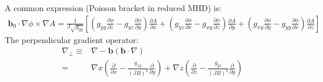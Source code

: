 \documentclass[12pt]{article}
\newcommand{\deriv}[2]{\ensuremath{\frac{\partial #1}{\partial #2}}}
\newcommand{\ve}[1]{\ensuremath{\boldsymbol{#1}}}
\newcommand{\bvec}{\ve{b}}
\begin{document}
%
A common expression (Poisson bracket in reduced MHD) is:
%
\begin{align*}
\bvec_0\cdot\nabla\phi\times\nabla A =
\frac{1}{J\sqrt{g_{yy}}}\left[\left(g_{yy}\deriv{\phi}{z} -
g_{yz}\deriv{\phi}{y}\right)\deriv{A}{x} + \left(g_{yz}\deriv{\phi}{x} -
g_{xy}\deriv{\phi}{z}\right)\deriv{A}{y} + \left(g_{xy}\deriv{\phi}{y} -
g_{yy}\deriv{\phi}{x}\right)\deriv{A}{z}\right]
\end{align*}
%
The perpendicular gradient operator:
%
\begin{align*}
\nabla_\perp \equiv& \nabla -
\ve{b}\left(\ve{b}\cdot\nabla\right) \\
 =& \nabla x\left(\deriv{}{x} -
\frac{g_{xy}}{\left(JB\right)^2}\deriv{}{y}\right) + \nabla z\left(\deriv{}{z}
- \frac{g_{yz}}{\left(JB\right)^2}\deriv{}{y}\right)
\end{align*}
\end{document}
